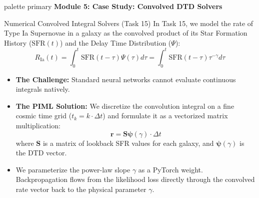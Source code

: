 \documentclass[9pt]{beamer}
\begin{document}
\begin{frame}[plain]
  \vfill
  \centering
  \begin{beamercolorbox}[sep=8pt,center,shadow=true,rounded=true]{palette primary}
    \textbf{Module 5: Case Study: Convolved DTD Solvers}
  \end{beamercolorbox}
  \vfill
\end{frame}

\begin{frame}{Numerical Convolved Integral Solvers (Task 15)}
  In Task 15, we model the rate of Type Ia Supernovae in a galaxy as the convolved product of its Star Formation History ($\text{SFR}(t)$) and the Delay Time Distribution ($\Psi$):
  $$R_{\text{Ia}}(t) = \int_0^t \text{SFR}(t - \tau) \Psi(\tau) d\tau = \int_0^t \text{SFR}(t - \tau) \tau^{-\gamma} d\tau$$
  \begin{itemize}
    \item \textbf{The Challenge:} Standard neural networks cannot evaluate continuous integrals natively.
    \item \textbf{The PIML Solution:} We discretize the convolution integral on a fine cosmic time grid ($t_k = k \cdot \Delta t$) and formulate it as a vectorized matrix multiplication:
      $$\mathbf{r} = \mathbf{S} \boldsymbol{\psi}(\gamma) \cdot \Delta t$$
      where $\mathbf{S}$ is a matrix of lookback SFR values for each galaxy, and $\boldsymbol{\psi}(\gamma)$ is the DTD vector.
    \item We parameterize the power-law slope $\gamma$ as a PyTorch weight. Backpropagation flows from the likelihood loss directly through the convolved rate vector back to the physical parameter $\gamma$.
  \end{itemize}
\end{frame}
\end{document}
